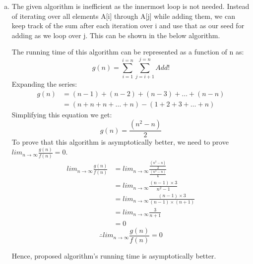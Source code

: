 \documentclass[11pt]{article}
\begin{document}
\begin{enumerate}[(a)]
	\item The given algorithm is inefficient as the innermost loop is not needed. Instead of iterating over all elements A[i] through A[j] while adding them, we can keep track of the sum after each iteration over i and use that as our seed for adding as we loop over j. This can be shown in the below algorithm. 
	\begin{algorithm}[H]
		\SetAlgoLined
	\end{algorithm}
	The running time of this algorithm can be represented as a function of n as:
	\begin{equation*}
		g(n) = \sum_{i=1}^{i=n} {\sum_{j=i+1}^{j=n} {Add!}}
	\end{equation*}
	Expanding the series:
	\begin{equation*}
	\begin{split}
		g(n) & = (n-1) + (n-2) + (n-3) + \ldots + (n-n) \\
		& = (n + n + n + \ldots + n) - (1 + 2 + 3 + \ldots + n)
	\end{split}
	\end{equation*}
	Simplifying this equation we get:
	\begin{equation*}
		g(n) = \frac{(n^2 - n)}{2}
	\end{equation*}
	To prove that this algorithm is asymptotically better, we need to prove $lim_{n\to\infty} \frac{g(n)}{f(n)} = 0$.
	\begin{equation*}
	\begin{split}
		lim_{n\to\infty} \frac{g(n)}{f(n)} & = lim_{n\to\infty} {\frac{\frac{(n^2 - n)}{2}}{\frac{(n^3 - n)}{6}}} \\
		& = lim_{n\to\infty} {\frac{(n - 1) \times 3}{n^2 - 1}} \\
		& = lim_{n\to\infty} {\frac{(n - 1) \times 3}{(n - 1) \times (n + 1)}} \\
		& = lim_{n\to\infty} {\frac{3}{n + 1}} \\
		& = 0
	\end{split}
	\end{equation*}
	\begin{equation*}
		\therefore lim_{n\to\infty} \frac{g(n)}{f(n)} = 0
	\end{equation*}

	Hence, proposed algorithm's running time is asymptotically better.
\end{enumerate}
\end{document}
